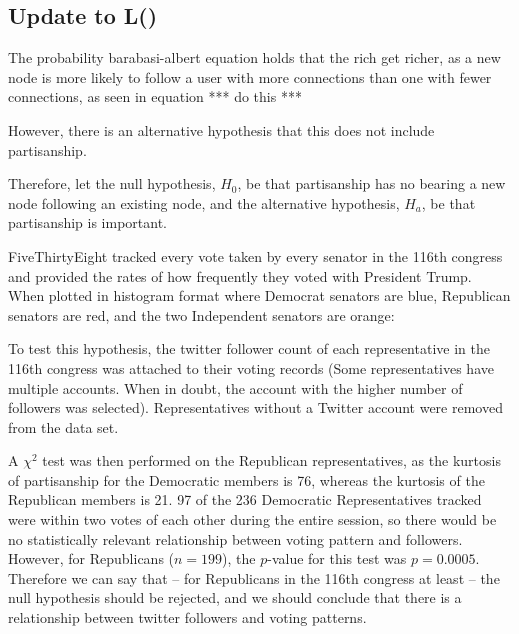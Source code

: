 \subsection{Update to L(\cdot)}
The probability barabasi-albert equation holds that the rich get richer, as a new node is more likely to follow a user with more connections than one with fewer connections, as seen in equation *** do this ***

However, there is an alternative hypothesis that this does not include partisanship.

Therefore, let the null hypothesis, $H_0$, be that partisanship has no bearing a new node following an existing node, and the alternative hypothesis, $H_a$, be that partisanship is important.

FiveThirtyEight tracked every vote taken by every senator in the 116th congress and provided the rates of how frequently they voted with President Trump. When plotted in histogram format where Democrat senators are blue, Republican senators are red, and the two Independent senators are orange: 



To test this hypothesis, the twitter follower count of each representative in the 116th congress was attached to their voting records (Some representatives have multiple accounts. When in doubt, the account with the higher number of followers was selected). Representatives without a Twitter account were removed from the data set. 

A $\chi^2$ test was then performed on the Republican representatives, as the kurtosis of partisanship for the Democratic members is 76, whereas the kurtosis of the Republican members is 21. 97 of the 236 Democratic Representatives tracked were within two votes of each other during the entire session, so there would be no statistically relevant relationship between voting pattern and followers. However, for Republicans ($n = 199$), the $p$-value for this test was $p=0.0005$. Therefore we can say that -- for Republicans in the 116th congress at least -- the null hypothesis should be rejected, and we should conclude that there is a relationship between twitter followers and voting patterns.